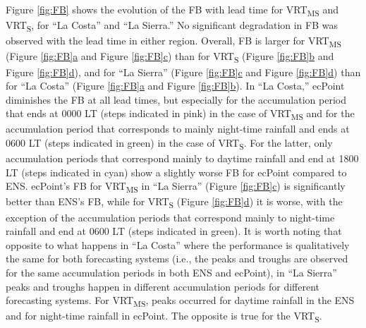 \documentclass[techmemo]{ecmwfrep}%
\begin{document}
Figure \ref{fig:FB} shows the evolution of the FB with lead time for VRT\textsubscript{MS} and VRT\textsubscript{S}, for “La Costa” and “La Sierra.” No significant degradation in FB was observed with the lead time in either region. Overall, FB is larger for VRT\textsubscript{MS} (Figure \ref{fig:FB}\hyperref[fig:FB]{a} and Figure \ref{fig:FB}\hyperref[fig:FB]{c}) than for VRT\textsubscript{S} (Figure \ref{fig:FB}\hyperref[fig:FB]{b} and Figure \ref{fig:FB}\hyperref[fig:FB]{d}), and for “La Sierra” (Figure \ref{fig:FB}\hyperref[fig:FB]{c} and Figure \ref{fig:FB}\hyperref[fig:FB]{d}) than for “La Costa” (Figure \ref{fig:FB}\hyperref[fig:FB]{a} and Figure \ref{fig:FB}\hyperref[fig:FB]{b}). In “La Costa,” ecPoint diminishes the FB at all lead times, but especially for the accumulation period that ends at 0000 LT (steps indicated in pink) in the case of VRT\textsubscript{MS} and for the accumulation period that corresponds to mainly night-time rainfall and ends at 0600 LT (steps indicated in green) in the case of VRT\textsubscript{S}. For the latter, only accumulation periods that correspond mainly to daytime rainfall and end at 1800 LT (steps indicated in cyan) show a slightly worse FB for ecPoint compared to ENS. ecPoint’s FB for VRT\textsubscript{MS} in “La Sierra” (Figure \ref{fig:FB}\hyperref[fig:FB]{c}) is significantly better than ENS’s FB, while for VRT\textsubscript{S} (Figure \ref{fig:FB}\hyperref[fig:FB]{d}) it is worse, with the exception of the accumulation periods that correspond mainly to night-time rainfall and end at 0600 LT (steps indicated in green). It is worth noting that opposite to what happens in “La Costa” where the performance is qualitatively the same for both forecasting systems (i.e., the peaks and troughs are observed for the same accumulation periods in both ENS and ecPoint), in “La Sierra” peaks and troughs happen in different accumulation periods for different forecasting systems. For VRT\textsubscript{MS}, peaks occurred for daytime rainfall in the ENS and for night-time rainfall in ecPoint. The opposite is true for the VRT\textsubscript{S}.
\end{document}
